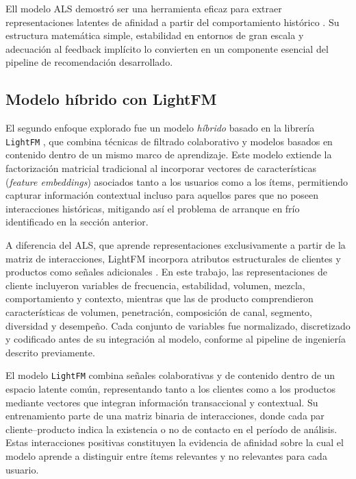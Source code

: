 Ell modelo ALS demostró ser una herramienta eficaz para extraer representaciones latentes de afinidad a partir del comportamiento histórico \cite{ARTICLE:Koren2009}. Su estructura matemática simple, estabilidad en entornos de gran escala y adecuación al feedback implícito lo convierten en un componente esencial del pipeline de recomendación desarrollado.

\subsection{Modelo híbrido con LightFM}

El segundo enfoque explorado fue un modelo \textit{híbrido} basado en la librería \texttt{LightFM} \cite{ARTICLE:LightFM2015}, que combina técnicas de filtrado colaborativo y modelos basados en contenido dentro de un mismo marco de aprendizaje. Este modelo extiende la factorización matricial tradicional al incorporar vectores de características (\textit{feature embeddings}) asociados tanto a los usuarios como a los ítems, permitiendo capturar información contextual incluso para aquellos pares que no poseen interacciones históricas, mitigando así el problema de arranque en frío identificado en la sección anterior.

A diferencia del ALS, que aprende representaciones exclusivamente a partir de la matriz de interacciones, LightFM incorpora atributos estructurales de clientes y productos como señales adicionales \cite{ARTICLE:LightFM2015}. En este trabajo, las representaciones de cliente incluyeron variables de frecuencia, estabilidad, volumen, mezcla, comportamiento y contexto, mientras que las de producto comprendieron características de volumen, penetración, composición de canal, segmento, diversidad y desempeño. Cada conjunto de variables fue normalizado, discretizado y codificado antes de su integración al modelo, conforme al pipeline de ingeniería descrito previamente.

El modelo \texttt{LightFM} combina señales colaborativas y de contenido dentro de un espacio latente común, representando tanto a los clientes como a los productos mediante vectores que integran información transaccional y contextual. Su entrenamiento parte de una matriz binaria de interacciones, donde cada par cliente–producto indica la existencia o no de contacto en el período de análisis. Estas interacciones positivas constituyen la evidencia de afinidad sobre la cual el modelo aprende a distinguir entre ítems relevantes y no relevantes para cada usuario.


